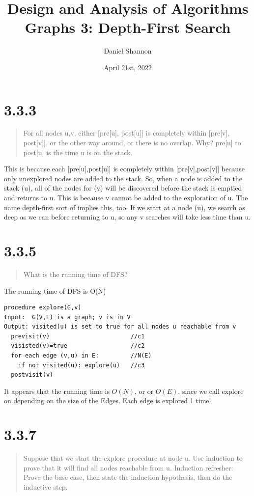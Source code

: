 \documentclass[12pt, letterpaper, twoside]{article}
\title{%
Design and Analysis of Algorithms\\
\large Graphs 3: Depth-First Search
}
\author{Daniel Shannon}
\date{April 21st, 2022}
\begin{document}
\begin{titlepage}
\maketitle
\end{titlepage}
\section*{3.3.3}
\begin{quote}
    For all nodes u,v, either [pre[u], post[u]] is completely within [pre[v], post[v]], or the other way around, or there is no overlap. Why?
    pre[u] to post[u] is the time u is on the stack.
\end{quote}
This is because each [pre[u],post[u]] is completely within [pre[v],post[v]] because only unexplored nodes are added to the stack.
So, when a node is added to the stack (u), all of the nodes for (v) will be discovered before the stack is emptied and returns to u. This is because v cannot be added to the exploration of u.
The name depth-first sort of implies this, too. If we start at a node (u), we search as deep as we can before returning to u, so any v searches will take less time than u.
\section*{3.3.5}
\begin{quote}
  What is the running time of DFS?
\end{quote}
The running time of DFS is O(N)
\begin{lstlisting}
procedure explore(G,v)
Input:  G(V,E) is a graph; v is in V
Output: visited(u) is set to true for all nodes u reachable from v
  previsit(v)                       //c1
  visisted(v)=true                  //c2
  for each edge (v,u) in E:         //N(E)
    if not visited(u): explore(u)   //c3
  postvisit(v)
\end{lstlisting}
It appears that the running time is $O(N)$, or or $O(E)$, since we call explore on depending on the size of the Edges.
Each edge is explored 1 time!
\section*{3.3.7}
\begin{quote}
Suppose that we start the explore procedure at node u. Use induction to prove that it will find all nodes reachable from u. Induction refresher: Prove the base case, then state the induction hypothesis, then do the inductive step.
\end{quote}
\end{document}
